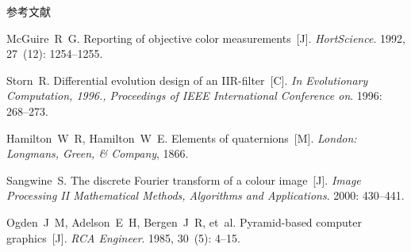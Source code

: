 \documentclass[xcolor=svgnames,serif,table]{beamer}
\begin{document}
\begin{frame}[allowframebreaks]{参考文献}
\begin{thebibliography}{10}
McGuire~R~G.
\newblock Reporting of objective color measurements~[J].
\newblock \emph{HortScience}.
1992, 27~(12):  1254--1255.

Storn~R.
\newblock Differential evolution design of an IIR-filter~[C].
\newblock \emph{In Evolutionary Computation, 1996., Proceedings of IEEE International
  Conference on}.
1996:  268--273.

{\beamertemplatebookbibitems
{}
Hamilton~W~R, Hamilton~W~E.
\newblock Elements of quaternions~[M].
\newblock \emph{London: Longmans, Green, \& Company}, 1866.}

Sangwine~S.
\newblock The discrete Fourier transform of a colour image~[J].
\newblock \emph{Image Processing II Mathematical Methods, Algorithms and Applications}.
2000:  430--441.

Ogden~J~M, Adelson~E~H, Bergen~J~R, et~al.
\newblock Pyramid-based computer graphics~[J].
\newblock \emph{RCA Engineer}.
1985, 30~(5):  4--15.
\end{thebibliography}
\end{frame}

\begin{frame}[plain]{}
  \begin{center}
  \end{center}
\end{frame}
\end{document}
